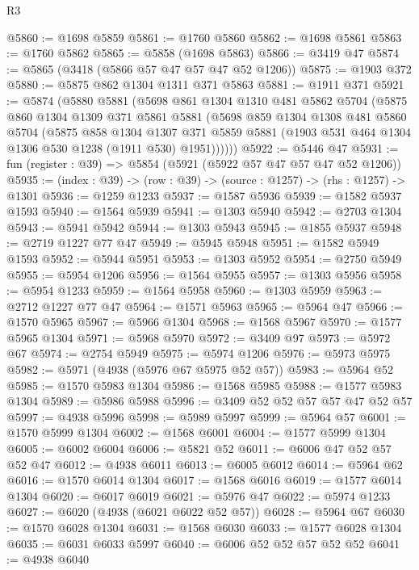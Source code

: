 \begin{lexlean}{R3}
\begin{coremodule}
@5860 := @1698 @5859
@5861 := @1760 @5860
@5862 := @1698 @5861
@5863 := @1760 @5862
@5865 := @5858 (@1698 @5863)
@5866 := @3419 @47
@5874 := @5865 (@3418 (@5866 @57 @47 @57 @47 @52 @1206))
@5875 := @1903 @372
@5880 := @5875 @862 @1304 @1311 @371 @5863
@5881 := @1911 @371
@5921 := @5874
    (@5880
      @5881
      (@5698
        @861
        @1304
        @1310
        @481
        @5862
        @5704
        (@5875
          @860
          @1304
          @1309
          @371
          @5861
          @5881
          (@5698
            @859
            @1304
            @1308
            @481
            @5860
            @5704
            (@5875
              @858
              @1304
              @1307
              @371
              @5859
              @5881
              (@1903 @531 @464 @1304 @1306 @530 @1238 (@1911 @530) @1951))))))
@5922 := @5446 @47
@5931 := fun (register : @39) => @5854 (@5921 (@5922 @57 @47 @57 @47 @52 @1206))
@5935 := (index : @39) -> (row : @39) -> (source : @1257) -> (rhs : @1257) -> @1301
@5936 := @1259 @1233
@5937 := @1587 @5936
@5939 := @1582 @5937 @1593
@5940 := @1564 @5939
@5941 := @1303 @5940
@5942 := @2703 @1304
@5943 := @5941 @5942
@5944 := @1303 @5943
@5945 := @1855 @5937
@5948 := @2719 @1227 @77 @47
@5949 := @5945 @5948
@5951 := @1582 @5949 @1593
@5952 := @5944 @5951
@5953 := @1303 @5952
@5954 := @2750 @5949
@5955 := @5954 @1206
@5956 := @1564 @5955
@5957 := @1303 @5956
@5958 := @5954 @1233
@5959 := @1564 @5958
@5960 := @1303 @5959
@5963 := @2712 @1227 @77 @47
@5964 := @1571 @5963
@5965 := @5964 @47
@5966 := @1570 @5965
@5967 := @5966 @1304
@5968 := @1568 @5967
@5970 := @1577 @5965 @1304
@5971 := @5968 @5970
@5972 := @3409 @97
@5973 := @5972 @67
@5974 := @2754 @5949
@5975 := @5974 @1206
@5976 := @5973 @5975
@5982 := @5971 (@4938 (@5976 @67 @5975 @52 @57))
@5983 := @5964 @52
@5985 := @1570 @5983 @1304
@5986 := @1568 @5985
@5988 := @1577 @5983 @1304
@5989 := @5986 @5988
@5996 := @3409 @52 @52 @57 @57 @47 @52 @57
@5997 := @4938 @5996
@5998 := @5989 @5997
@5999 := @5964 @57
@6001 := @1570 @5999 @1304
@6002 := @1568 @6001
@6004 := @1577 @5999 @1304
@6005 := @6002 @6004
@6006 := @5821 @52
@6011 := @6006 @47 @52 @57 @52 @47
@6012 := @4938 @6011
@6013 := @6005 @6012
@6014 := @5964 @62
@6016 := @1570 @6014 @1304
@6017 := @1568 @6016
@6019 := @1577 @6014 @1304
@6020 := @6017 @6019
@6021 := @5976 @47
@6022 := @5974 @1233
@6027 := @6020 (@4938 (@6021 @6022 @52 @57))
@6028 := @5964 @67
@6030 := @1570 @6028 @1304
@6031 := @1568 @6030
@6033 := @1577 @6028 @1304
@6035 := @6031 @6033 @5997
@6040 := @6006 @52 @52 @57 @52 @52
@6041 := @4938 @6040

\end{coremodule}
\end{lexlean}
